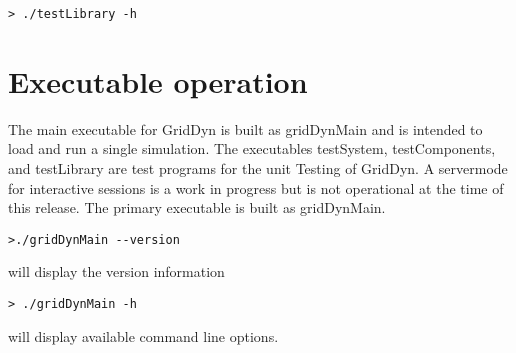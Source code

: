 \documentclass[12pt]{article} %
\begin{document}
\begin{verbatim}
> ./testLibrary -h
\end{verbatim}
\section{Executable operation}
The main executable for GridDyn is built as gridDynMain  and is intended to load and run a single simulation.    The executables testSystem, testComponents, and testLibrary are test programs for the unit Testing of GridDyn.  A servermode for interactive sessions is a work in progress but is not operational at the time of this release.  The primary executable is built as gridDynMain.
\begin{verbatim}
>./gridDynMain --version
\end{verbatim}
will display the version information
\begin{verbatim}
> ./gridDynMain -h
\end{verbatim}
will display available command line options.
\end{document}
